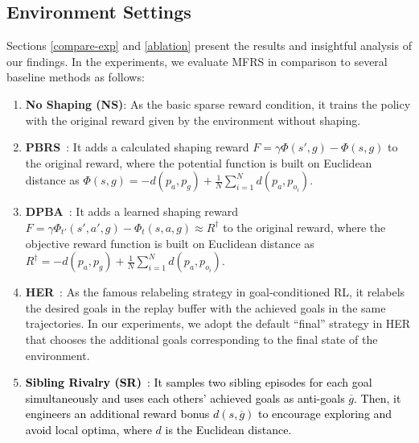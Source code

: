 \documentclass[journal]{IEEEtran}
\begin{document}
\subsection{Environment Settings}\label{env-setting}
Sections \ref{compare-exp} and \ref{ablation} present the results and insightful analysis of our findings. In the experiments, we evaluate MFRS in comparison to several baseline methods as follows:
\begin{enumerate}
	\item \textbf{No Shaping (NS)}: As the basic sparse reward condition, it trains the policy with the original reward given by the environment without shaping.

	\item \textbf{PBRS}~\citep{ng1999policy}: It adds a calculated shaping reward $F=\gamma\Phi(s', g)-\Phi(s, g)$ to the original reward, where the potential function is built on Euclidean distance as $\Phi(s,g)=-d(p_a,p_g)+\frac{1}{N}\sum_{i=1}^{N}d(p_a,p_{o_i})$.
	
	\item \textbf{DPBA}~\citep{harutyunyan2015expressing}: It adds a learned shaping reward $F=\gamma\Phi_{t'}(s',a',g)-\Phi_{t}(s,a,g)\approx R^{\dagger}$ to the original reward, where the objective reward function is built on Euclidean distance as $R^{\dagger}=-d(p_a,p_g)+\frac{1}{N}\sum_{i=1}^{N}d(p_a,p_{o_i})$.
	
	\item \textbf{HER}~\citep{andrychowicz2017hindsight}: As the famous relabeling strategy in goal-conditioned RL, it relabels the desired goals in the replay buffer with the achieved goals in the same trajectories. In our experiments, we adopt the default ``final'' strategy in HER that chooses the additional goals corresponding to the final state of the environment.
	 
	\item \textcolor{black}{
	\textbf{Sibling Rivalry (SR)}~\citep{trott2019keeping}: It samples two sibling episodes for each goal simultaneously and uses each others' achieved goals as anti-goals $\overline{g}$. Then, it engineers an additional reward bonus $d(s, \overline{g})$ to encourage exploring and avoid local optima, where $d$ is the Euclidean distance.}
	

\end{enumerate}
\end{document}

